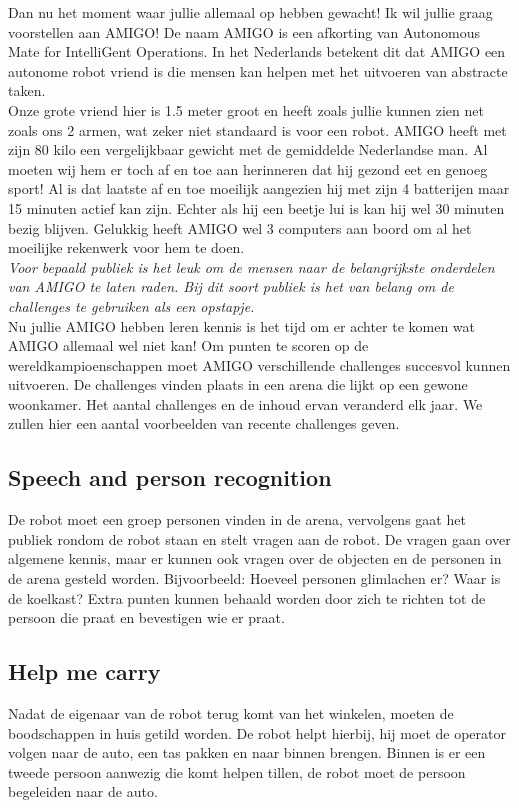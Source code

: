 \documentclass[a4paper,10pt]{article}
\numberwithin{equation}{section}
\numberwithin{figure}{section}
\numberwithin{table}{section}
\begin{document}
Dan nu het moment waar jullie allemaal op hebben gewacht! Ik wil jullie graag voorstellen aan AMIGO! De naam AMIGO is een afkorting van Autonomous Mate for IntelliGent Operations. In het Nederlands betekent dit dat AMIGO een autonome robot vriend is die mensen kan helpen met het uitvoeren van abstracte taken. \\

Onze grote vriend hier is 1.5 meter groot en heeft zoals jullie kunnen zien net zoals ons 2 armen, wat zeker niet standaard is voor een robot. AMIGO heeft met zijn 80 kilo een vergelijkbaar gewicht met de gemiddelde Nederlandse man. Al moeten wij hem er toch af en toe aan herinneren dat hij gezond eet en genoeg sport!
Al is dat laatste af en toe moeilijk aangezien hij met zijn 4 batterijen maar 15 minuten actief kan zijn. Echter als hij een beetje lui is kan hij wel 30 minuten bezig blijven. Gelukkig heeft AMIGO wel 3 computers aan boord om al het moeilijke rekenwerk voor hem te doen.\\

\textit{Voor bepaald publiek is het leuk om de mensen naar de belangrijkste onderdelen van AMIGO te laten raden. Bij dit soort publiek is het van belang om de challenges te gebruiken als een opstapje.}\\

Nu jullie AMIGO hebben leren kennis is het tijd om er achter te komen wat AMIGO allemaal wel niet kan! Om punten te scoren op de wereldkampioenschappen moet AMIGO verschillende challenges succesvol kunnen uitvoeren. De challenges vinden plaats in een arena die lijkt op een gewone woonkamer. Het aantal challenges en de inhoud ervan veranderd elk jaar. We zullen hier een aantal voorbeelden van recente challenges geven.

\subsection*{Speech and person recognition}
De robot moet een groep personen vinden in de arena, vervolgens gaat het publiek rondom de robot staan en stelt vragen aan de robot. De vragen gaan over algemene kennis, maar er kunnen ook vragen over de objecten en de personen in de arena gesteld worden. Bijvoorbeeld: Hoeveel personen glimlachen er? Waar is de koelkast? Extra punten kunnen behaald worden door zich te richten tot de persoon die praat en bevestigen wie er praat. 

\subsection*{Help me carry}
Nadat de eigenaar van de robot terug komt van het winkelen, moeten de boodschappen in huis getild worden. De robot helpt hierbij, hij moet de operator volgen naar de auto, een tas pakken en naar binnen brengen. Binnen is er een tweede persoon aanwezig die komt helpen tillen, de robot moet de persoon begeleiden naar de auto.
\end{document}
